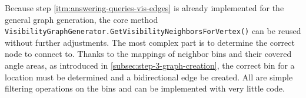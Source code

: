 	Because step \ref{itm:answering-queries-vis-edges} is already implemented for the general graph generation, the core method \texttt{VisibilityGraphGenerator.GetVisibilityNeighborsForVertex()} can be reused without further adjustments.
	The most complex part is to determine the correct node to connect to.
	Thanks to the mappings of neighbor bins and their covered angle areas, as introduced in \cref{subsec:step-3-graph-creation}, the correct bin for a location must be determined and a bidirectional edge be created.
	All are simple filtering operations on the bins and can be implemented with very little code.